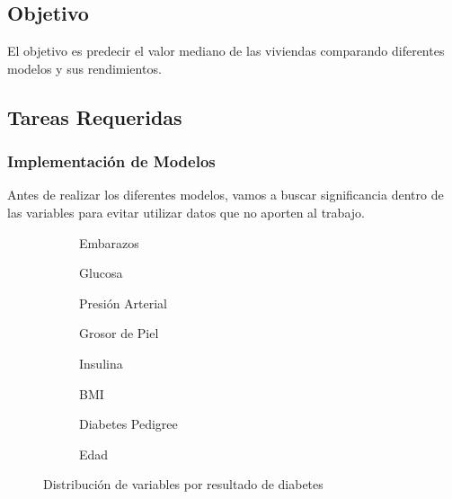 \documentclass[12pt,a4paper]{article}
\begin{document}
\subsection{Objetivo}

El objetivo es predecir el valor mediano de las viviendas comparando diferentes modelos y sus rendimientos.

\subsection{Tareas Requeridas}

\subsubsection{Implementación de Modelos}

Antes de realizar los diferentes modelos, vamos a buscar significancia dentro de las variables para evitar utilizar datos que no aporten al trabajo.

\begin{figure}[H]
\centering
\begin{subfigure}[t]{0.24\textwidth}
    \centering
    \caption{\footnotesize Embarazos}
    \label{fig:modelo_pregnancies}
\end{subfigure}
\hfill
\begin{subfigure}[t]{0.24\textwidth}
    \centering
    \caption{\footnotesize Glucosa}
    \label{fig:modelo_glucose}
\end{subfigure}
\hfill
\begin{subfigure}[t]{0.24\textwidth}
    \centering
    \caption{\footnotesize Presión Arterial}
    \label{fig:modelo_blood_pressure}
\end{subfigure}
\hfill
\begin{subfigure}[t]{0.24\textwidth}
    \centering
    \caption{\footnotesize Grosor de Piel}
    \label{fig:modelo_skin}
\end{subfigure}

\vspace{0.2cm}

\begin{subfigure}[t]{0.24\textwidth}
    \centering
    \caption{\footnotesize Insulina}
    \label{fig:modelo_insuline}
\end{subfigure}
\hfill
\begin{subfigure}[t]{0.24\textwidth}
    \centering
    \caption{\footnotesize BMI}
    \label{fig:modelo_bmi}
\end{subfigure}
\hfill
\begin{subfigure}[t]{0.24\textwidth}
    \centering
    \caption{\footnotesize Diabetes Pedigree}
    \label{fig:modelo_diabetes}
\end{subfigure}
\hfill
\begin{subfigure}[t]{0.24\textwidth}
    \centering
    \caption{\footnotesize Edad}
    \label{fig:modelo_age}
\end{subfigure}

\caption{Distribución de variables por resultado de diabetes}
\label{fig:distribucion_variables}
\end{figure}
\end{document}
